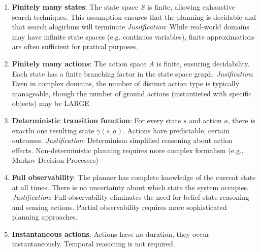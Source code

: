 \documentclass[a4paper]{article}
\theoremstyle{definition}
\begin{document}
\begin{enumerate}
    \item \textbf{Finitely many states}: The state space \( S \) is finite, allowing exhaustive search techniques.
        This assumption ensures that the planning is decidable and that search alogirhms will terminate
        \vspace{1em}
        \noindent
        \newline
        \textit{Jusitfication}: While real-world domains may have infinite state spaces (e.g. continuos 
        variables), finite approximations are often sufficient for pratical purposes.
    \item \textbf{Finitely many actions}: The action space \( A \) is finite, ensuring decidability. Each state
        has a finite branching factor in the state space graph.
        \vspace{1em}
        \noindent
        \newline
        \textit{Jusification}: Even in complex domains, the number of distinct action type is 
        typically manageable, though the number of ground actions (instantieted with specific objects)
        may be LARGE
    \item \textbf{Deterministic transition function}: For every state \( s \) and action \( a \), there 
        is exactlu one resulting state \( \gamma(s,a) \). Actions have predictable, certain outcomes.
        \vspace{1em}
        \noindent   
        \newline
        \textit{Justification}: Determinism simplified reasoning about action effects. Non-deterministic 
        planning requires more complex formalism (e.g., Markov Decision Processes)
    \item \textbf{Full observability}: The planner has complete knowledge of the current state at all times.
        There is no uncertainty about which state the system occupies.
        \vspace{1em}
        \noindent
        \newline
        \textit{Justification}: Full observability eliminates the need for belief state reasoning and sensing actions.
        Partial observability requires more sophisticated planning approaches.
    \item \textbf{Instantaneous actions}: Actions have no duration, they occur instantaneously. Temporal 
        reasoning is not required.
        \vspace{1em}
        \noindent

\end{enumerate}
\end{document}
